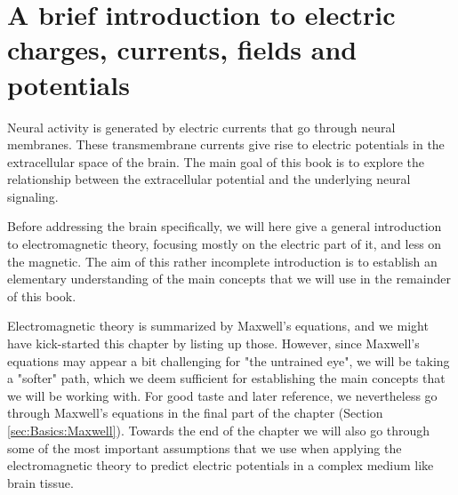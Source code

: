 \chapter{A brief introduction to electric charges, currents, fields and potentials}
\label{chap:Basics}

Neural activity is generated by electric currents that go through neural membranes. These transmembrane currents give rise to electric potentials in the extracellular space of the brain. The main goal of this book is to explore the relationship between the extracellular potential and the underlying neural signaling. 

Before addressing the brain specifically, we will here give a general introduction to electromagnetic theory, focusing mostly on the electric part of it, and less on the magnetic. The aim of this rather incomplete introduction is to establish an elementary understanding of the main concepts that we will use in the remainder of this book.

Electromagnetic theory is summarized by Maxwell's equations, and we might have kick-started this chapter by listing up those. However, since Maxwell's equations may appear a bit challenging for "the untrained eye", we will be taking a "softer" path, which we deem sufficient for establishing the main concepts that we will be working with. For good taste and later reference, we nevertheless go through Maxwell's equations in the final part of the chapter (Section \ref{sec:Basics:Maxwell}). Towards the end of the chapter we will also go through some of the most important assumptions that we use when applying the electromagnetic theory to predict electric potentials in a complex medium like brain tissue.

